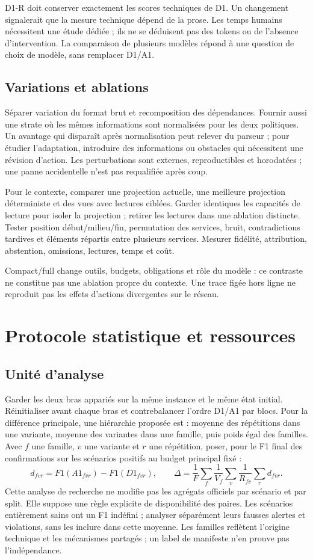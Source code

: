 \documentclass[11pt,a4paper]{article}
\begin{document}
D1-R doit conserver exactement les scores techniques de D1. Un changement
signalerait que la mesure technique dépend de la prose. Les temps humains
nécessitent une étude dédiée ; ils ne se déduisent pas des tokens ou de
l'absence d'intervention. La comparaison de plusieurs modèles répond à une
question de choix de modèle, sans remplacer D1/A1.

\subsection{Variations et ablations}
Séparer variation du format brut et recomposition des dépendances. Fournir aussi
une strate où les mêmes informations sont normalisées pour les deux politiques.
Un avantage qui disparaît après normalisation peut relever du parseur ; pour
étudier l'adaptation, introduire des informations ou obstacles qui nécessitent
une révision d'action. Les perturbations sont externes, reproductibles et
horodatées ; une panne accidentelle n'est pas requalifiée après coup.

Pour le contexte, comparer une projection actuelle, une meilleure projection
déterministe et des vues avec lectures ciblées. Garder identiques les capacités
de lecture pour isoler la projection ; retirer les lectures dans une ablation
distincte. Tester position début/milieu/fin, permutation des services, bruit,
contradictions tardives et éléments répartis entre plusieurs services. Mesurer
fidélité, attribution, abstention, omissions, lectures, temps et coût.

Compact/full change outils, budgets, obligations et rôle du modèle : ce
contraste ne constitue pas une ablation propre du contexte. Une trace figée
hors ligne ne reproduit pas les effets d'actions divergentes sur le réseau.

\section{Protocole statistique et ressources}
\subsection{Unité d'analyse}
Garder les deux bras appariés sur la même instance et le même état initial.
Réinitialiser avant chaque bras et contrebalancer l'ordre D1/A1 par blocs.
Pour la différence principale, une hiérarchie proposée est : moyenne des
répétitions dans une variante, moyenne des variantes dans une famille, puis
poids égal des familles. Avec $f$ une famille, $v$ une variante et $r$ une
répétition, poser, pour le F1 final des confirmations sur les scénarios positifs
au budget principal fixé :
\[
 d_{fvr}=F1(A1_{fvr})-F1(D1_{fvr}),\qquad
 \Delta=\frac{1}{F}\sum_f\frac{1}{V_f}\sum_v\frac{1}{R_{fv}}\sum_r d_{fvr}.
\]
Cette analyse de recherche ne modifie pas les agrégats officiels par scénario
et par split. Elle suppose une règle explicite de disponibilité des paires.
Les scénarios entièrement sains ont un F1 indéfini ; analyser séparément leurs
fausses alertes et violations, sans les inclure dans cette moyenne.
Les familles reflètent l'origine technique et les mécanismes partagés ; un
label de manifeste n'en prouve pas l'indépendance.
\end{document}
